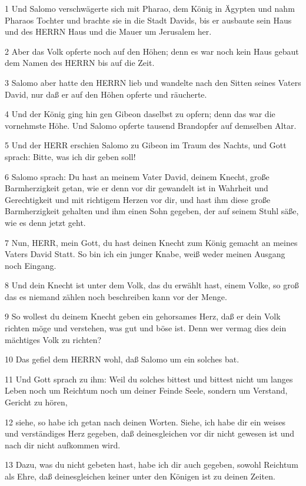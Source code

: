 \par 1 Und Salomo verschwägerte sich mit Pharao, dem König in Ägypten und nahm Pharaos Tochter und brachte sie in die Stadt Davids, bis er ausbaute sein Haus und des HERRN Haus und die Mauer um Jerusalem her.
\par 2 Aber das Volk opferte noch auf den Höhen; denn es war noch kein Haus gebaut dem Namen des HERRN bis auf die Zeit.
\par 3 Salomo aber hatte den HERRN lieb und wandelte nach den Sitten seines Vaters David, nur daß er auf den Höhen opferte und räucherte.
\par 4 Und der König ging hin gen Gibeon daselbst zu opfern; denn das war die vornehmste Höhe. Und Salomo opferte tausend Brandopfer auf demselben Altar.
\par 5 Und der HERR erschien Salomo zu Gibeon im Traum des Nachts, und Gott sprach: Bitte, was ich dir geben soll!
\par 6 Salomo sprach: Du hast an meinem Vater David, deinem Knecht, große Barmherzigkeit getan, wie er denn vor dir gewandelt ist in Wahrheit und Gerechtigkeit und mit richtigem Herzen vor dir, und hast ihm diese große Barmherzigkeit gehalten und ihm einen Sohn gegeben, der auf seinem Stuhl säße, wie es denn jetzt geht.
\par 7 Nun, HERR, mein Gott, du hast deinen Knecht zum König gemacht an meines Vaters David Statt. So bin ich ein junger Knabe, weiß weder meinen Ausgang noch Eingang.
\par 8 Und dein Knecht ist unter dem Volk, das du erwählt hast, einem Volke, so groß das es niemand zählen noch beschreiben kann vor der Menge.
\par 9 So wollest du deinem Knecht geben ein gehorsames Herz, daß er dein Volk richten möge und verstehen, was gut und böse ist. Denn wer vermag dies dein mächtiges Volk zu richten?
\par 10 Das gefiel dem HERRN wohl, daß Salomo um ein solches bat.
\par 11 Und Gott sprach zu ihm: Weil du solches bittest und bittest nicht um langes Leben noch um Reichtum noch um deiner Feinde Seele, sondern um Verstand, Gericht zu hören,
\par 12 siehe, so habe ich getan nach deinen Worten. Siehe, ich habe dir ein weises und verständiges Herz gegeben, daß deinesgleichen vor dir nicht gewesen ist und nach dir nicht aufkommen wird.
\par 13 Dazu, was du nicht gebeten hast, habe ich dir auch gegeben, sowohl Reichtum als Ehre, daß deinesgleichen keiner unter den Königen ist zu deinen Zeiten.
